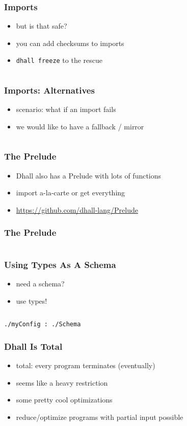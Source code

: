 \documentclass{beamer}
\begin{document}
\begin{frame}
  \frametitle{Imports}
  \begin{itemize}
  \item but is that safe?
  \item you can add checksums to imports
  \item \texttt{dhall freeze} to the rescue
  \end{itemize}
  \vfill
  \inputminted[fontsize=\scriptsize]{text}{dhall/persons/UrlImportFrozen.dhall}
\end{frame}

\begin{frame}
  \frametitle{Imports: Alternatives}
  \begin{itemize}
  \item scenario: what if an import fails
  \item we would like to have a fallback / mirror
  \end{itemize}
  \vfill
  \inputminted{text}{dhall/persons/UrlImportFallback.dhall}
\end{frame}

\begin{frame}
  \frametitle{The Prelude}
  \begin{itemize}
  \item Dhall also has a Prelude with lots of functions
  \item import a-la-carte or get everything
  \item \url{https://github.com/dhall-lang/Prelude}
  \end{itemize}
\end{frame}

\begin{frame}
  \frametitle{The Prelude}
  \inputminted[fontsize=\scriptsize]{text}{dhall/use-prelude.dhall}
\end{frame}

\begin{frame}[fragile]
  \frametitle{Using Types As A Schema}
  \begin{itemize}
  \item need a schema?
  \item use types!
  \end{itemize}
 \inputminted{text}{dhall/schema/Schema}
 \begin{verbatim}
./myConfig : ./Schema
 \end{verbatim}
\end{frame}

\begin{frame}
  \frametitle{Dhall Is Total}
  \begin{itemize}
  \item total: every program terminates (eventually)
  \item seems like a heavy restriction
  \item some pretty cool optimizations
  \item reduce/optimize programs with partial input possible
  \end{itemize}
\end{frame}
\end{document}
